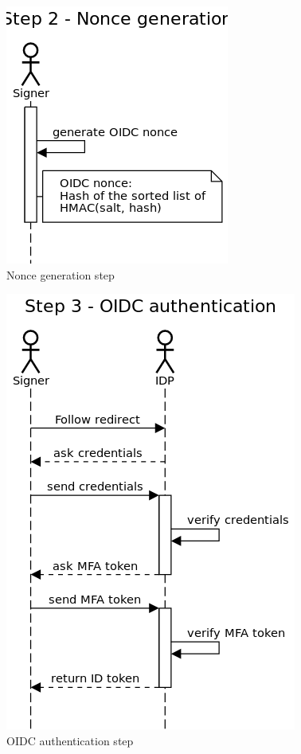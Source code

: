 \begin{figure}
	\begin{center}
		\includegraphics[scale=0.5]{images/protocol_step2_nonce_generation.png}
		\caption{Nonce generation step}
		\label{fig:noncegenerationstep}
	\end{center}
\end{figure}

\begin{figure}
	\begin{center}
		\includegraphics[scale=0.5]{images/protocol_step3_oidc_authentication.png}
		\caption{OIDC authentication step}
		\label{fig:oidcauthenticationstep}
	\end{center}
\end{figure}

